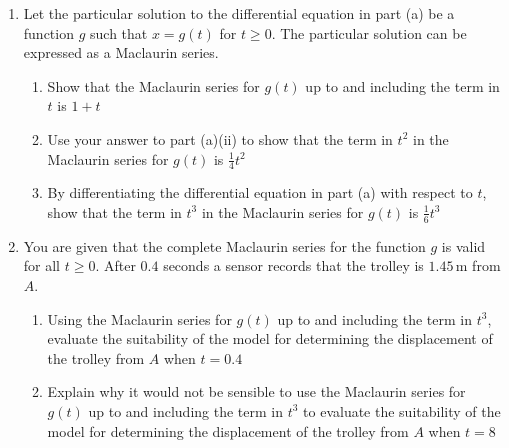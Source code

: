\documentclass[leqno]{article}
\begin{document}
\begin{enumerate}[
  label=\textbf{\arabic*.},
  leftmargin=*,
  topsep=0pt,
  partopsep=0pt,
  parsep=0pt
]
\begin{enumerate}[label=\textbf{(\alph*)}]
\begin{enumerate}[label=(\roman*)]
  \end{enumerate}
  \item Let the particular solution to the differential equation in part (a) be a function $g$ such that $x=g(t)$ for $t\ge 0$. The particular solution can be expressed as a Maclaurin series. \\
  \begin{enumerate}[label=(\roman*)]
    \item Show that the Maclaurin series for $g(t)$ up to and including the term in $t$ is $1+t$ 
    \item Use your answer to part (a)(ii) to show that the term in $t^2$ in the Maclaurin series for $g(t)$ is $\frac{1}{4}t^2$ 
    \item By differentiating the differential equation in part (a) with respect to $t$, show that the term in $t^3$ in the Maclaurin series for $g(t)$ is $\frac{1}{6}t^3$  \\
  \end{enumerate}
  \item You are given that the complete Maclaurin series for the function $g$ is valid for all $t\ge 0$. After $0.4$ seconds a sensor records that the trolley is $1.45\,\mathrm{m}$ from $A$. \\
  \begin{enumerate}[label=(\roman*)]
    \item Using the Maclaurin series for $g(t)$ up to and including the term in $t^3$, evaluate the suitability of the model for determining the displacement of the trolley from $A$ when $t=0.4$  \\

    \item Explain why it would not be sensible to use the Maclaurin series for $g(t)$ up to and including the term in $t^3$ to evaluate the suitability of the model for determining the displacement of the trolley from $A$ when $t=8$  \\
  \end{enumerate}
\end{enumerate}

\vspace*{30pt}


\end{enumerate}
\end{document}

